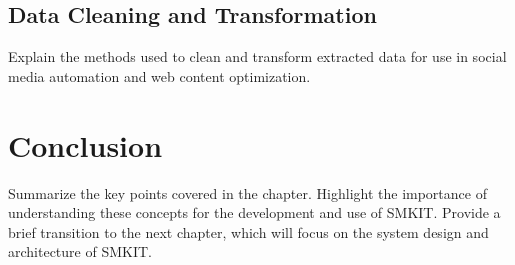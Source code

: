 \subsection{Data Cleaning and Transformation}
\label{subsec:data_cleaning_and_transformation}
Explain the methods used to clean and transform extracted data for use in social media automation and web content optimization.

\section{Conclusion}
\label{sec:preliminaries_conclusion}
Summarize the key points covered in the chapter.
Highlight the importance of understanding these concepts for the development and use of SMKIT. Provide a brief transition to the next chapter, which will focus on the system design and architecture of SMKIT.
